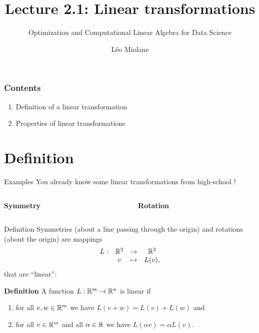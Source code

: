 \documentclass{beamer}
\title{Lecture 2.1: Linear transformations}
\subtitle{Optimization and Computational Linear Algebra for Data Science}
\author{Léo Miolane}
\date{}
\begin{document}
\setcounter{showProgressBar}{0}
\setcounter{showSlideNumbers}{0}

\frame{\titlepage}

\begin{frame}
	\frametitle{Contents}
	\begin{enumerate}
		\item Definition of a linear transformation
			\vspace{1cm}
		\item Properties of linear transformations
	\end{enumerate}
\end{frame}


\setcounter{framenumber}{0}
\setcounter{showSlideNumbers}{1}
\section{Definition}
\begin{frame}[t]{Examples}
	You already know some linear transformations from high-school !

	\vspace{0.6cm}
	\begin{columns}
		\begin{column}{0.47\textwidth}
			\vspace{-0.25cm}
			\begin{center}
				\textbf{Symmetry}
			\end{center}
			\vspace{5cm}
		\end{column}
		\vrule
		\vrule
		\begin{column}{0.53\textwidth}
			\vspace{-0.5cm}
			\begin{center}
				\textbf{Rotation}
				\vspace{5cm}
			\end{center}
		\end{column}
	\end{columns}


\end{frame}

\begin{frame}[t]{Definition}
	Symmetries (about a line passing through the origin) and rotations (about the origin) are mappings
	$$
	\begin{array}{cccc}
		L: & \mathbb{R}^2 & \to & \mathbb{R}^2 \\
		   & v & \mapsto & L(v),
	\end{array}
	$$
	that are ``linear'':
	\vspace{0.3cm}
	\begin{block}{\bf Definition}
		A function $L: \mathbb{R}^m \to \mathbb{R}^n$ is linear if
		\begin{enumerate}
			\item for all $v,w \in \mathbb{R}^m$ we have $L(v + w) = L(v) + L(w)$ and
			\item for all $v \in \mathbb{R}^m$ and all $\alpha \in \mathbb{R}$ we have $L(\alpha v) = \alpha L(v)$.
		\end{enumerate}
	\end{block}
\end{frame}
\end{document}
